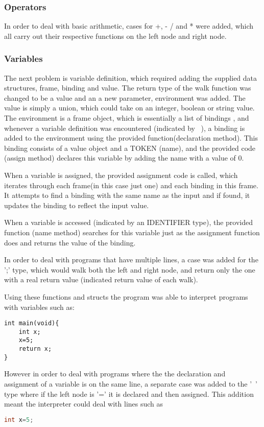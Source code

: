 \documentclass[11pt]{article}
\begin{document}
\subsubsection{Operators}
In order to deal with basic arithmetic, cases for +, - / and * were added, which all carry out their respective functions on the left node and right node. 

\subsubsection{Variables}
The next problem is variable definition, which required adding the supplied data structures, frame, binding and value. The return type of the walk function was changed to be a value and an a new parameter, environment was added. The value is simply a union, which could take on an integer, boolean or string value. The environment is a frame object, which is essentially a list of bindings , and whenever a variable definition was encountered (indicated by ~), a binding is added to the environment using the provided function(declaration method). This binding consists of a value object and a TOKEN (name), and the provided code (assign method) declares this variable by adding the name with a value of 0. 

When a variable is assigned, the provided assignment code is called, which iterates through each frame(in this case just one) and each binding in this frame. It attempts to find a binding with the same name as the input and if found, it updates the binding to reflect the input value.

When a variable is accessed (indicated by an IDENTIFIER type), the provided function (name method) searches for this variable just as the assignment function does and returns the value of the binding. 

In order to deal with programs that have multiple lines, a case was added for the ';' type, which would walk both the left and right node, and return only the one with a real return value (indicated return value of each walk). 

Using these functions and structs the program was able to interpret programs with variables such as:
\begin{lstlisting}
int main(void){
	int x;
	x=5;
 	return x;
}
\end{lstlisting}

However in order to deal with programs where the the declaration and assignment of a variable is on the same line, a separate case was added to the '~' type where if the left node is '=' it is declared and then assigned. This addition meant the interpreter could deal with lines such as
\begin {lstlisting}[language=C]
int x=5;
\end{lstlisting}
\end{document}

